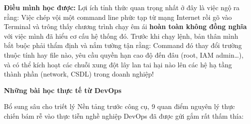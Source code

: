 \textbf{Điều mình học được:} Lợi ích tỉnh thức quan trọng nhất ở đây là
việc ngộ ra rằng: Việc chép vội một command line phức tạp từ mạng
Internet rồi gõ vào Terminal và trông thấy chương trình chạy êm ái
\textbf{hoàn toàn không đồng nghĩa} với việc mình đã hiểu cơ cấu hệ
thống đó. Trước khi chạy lệnh, bản thân mình bắt buộc phải thẩm định và
nắm tường tận rằng: Command đó thay đổi trường thuộc tính hay file nào,
yêu cầu quyền hạn cao độ đến đâu (root, IAM admin\ldots), và có thể kích
hoạt các chuỗi xung đột lây lan tai hại nào lên các hệ hạ tầng thành
phần (network, CSDL) trong doanh nghiệp!

\vspace{0.5em}\noindent\textbf{Những bài học thực tế từ
DevOps}\par

Bổ sung sâu cho triết lý Nền tảng trước công cụ, 9 quan điểm nguyên lý
thực chiến bám rễ vào thực tiễn nghề nghiệp DevOps đã được gửi gắm rất
thấm thía:

